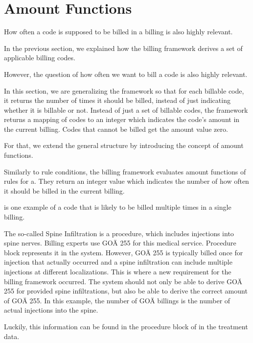 \section{Amount Functions}\label{sec:amount-functions}


How often a code is supposed to be billed in a billing is also highly relevant.

In the previous section, we explained how the billing framework derives a set of applicable billing codes.

However, the question of how often we want to bill a code is also highly relevant.

In this section, we are generalizing the framework so that for each billable code,
it returns the number of times it should be billed, instead of just indicating whether it is billable or not.
Instead of just a set of billable codes, the framework returns a mapping of codes to an integer which indicates the code's amount in the current billing.
Codes that cannot be billed get the amount value zero.

For that, we extend the general structure by introducing the concept of amount functions.

Similarly to rule conditions, the billing framework evaluates amount functions of rules for a.
They return an integer value which indicates the number of how often it should be billed in the current billing.

\cite{hermanns2013bemessung} is one example of a code that is likely to be billed multiple times in a single billing.

The so-called Spine Infiltration is a procedure, which includes injections into spine nerves.
Billing experts use GOÄ 255 for this medical service.
Procedure block represents it in the system.
However, GOÄ 255 is typically billed once for injection that actually occurred and a spine infiltration can include multiple injections at different localizations.
This is where a new requirement for the billing framework occurred.
The system should not only be able to derive GOÄ 255 for provided spine infiltrations, but also be able to derive the correct amount of GOÄ 255.
In this example, the number of GOÄ billings is the number of actual injections into the spine.

Luckily, this information can be found in the procedure block of in the treatment data.

